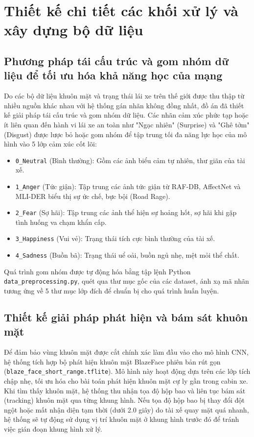 \documentclass[../DoAn.tex]{subfiles}
\begin{document}
\section{Thiết kế chi tiết các khối xử lý và xây dựng bộ dữ liệu}
\label{section:4.3}

\subsection{Phương pháp tái cấu trúc và gom nhóm dữ liệu để tối ưu hóa khả năng học của mạng}
Do các bộ dữ liệu khuôn mặt và trạng thái lái xe trên thế giới được thu thập từ nhiều nguồn khác nhau với hệ thống gán nhãn không đồng nhất, đồ án đã thiết kế giải pháp tái cấu trúc và gom nhóm dữ liệu. Các nhãn cảm xúc phức tạp hoặc ít liên quan đến hành vi lái xe an toàn như "Ngạc nhiên" (Surprise) và "Ghê tởm" (Disgust) được lược bỏ hoặc gom nhóm để tập trung tối đa năng lực học của mô hình vào 5 lớp cảm xúc cốt lõi:
\begin{itemize}
    \item \texttt{0\_Neutral} (Bình thường): Gồm các ảnh biểu cảm tự nhiên, thư giãn của tài xế.
    \item \texttt{1\_Anger} (Tức giận): Tập trung các ảnh tức giận từ RAF-DB, AffectNet và MLI-DER biểu thị sự ức chế, bực bội (Road Rage).
    \item \texttt{2\_Fear} (Sợ hãi): Tập trung các ảnh thể hiện sự hoảng hốt, sợ hãi khi gặp tình huống va chạm khẩn cấp.
    \item \texttt{3\_Happiness} (Vui vẻ): Trạng thái tích cực bình thường của tài xế.
    \item \texttt{4\_Sadness} (Buồn bã): Trạng thái uể oải, buồn ngủ nhẹ, mệt mỏi thể chất.
\end{itemize}

Quá trình gom nhóm được tự động hóa bằng tập lệnh Python \texttt{data\_preprocessing.py}, quét qua thư mục gốc của các dataset, ánh xạ mã nhãn tương ứng về 5 thư mục lớp đích để chuẩn bị cho quá trình huấn luyện.

\subsection{Thiết kế giải pháp phát hiện và bám sát khuôn mặt}
Để đảm bảo vùng khuôn mặt được cắt chính xác làm đầu vào cho mô hình CNN, hệ thống tích hợp bộ phát hiện khuôn mặt BlazeFace phiên bản rút gọn (\texttt{blaze\_face\_short\_range.tflite}).
Mô hình này hoạt động dựa trên các lớp tích chập nhẹ, tối ưu hóa cho bài toán phát hiện khuôn mặt cự ly gần trong cabin xe. Khi tìm thấy khuôn mặt, hệ thống thu nhận tọa độ hộp bao và liên tục bám sát (tracking) khuôn mặt qua từng khung hình. Nếu tọa độ hộp bao bị thay đổi đột ngột hoặc mất nhận diện tạm thời (dưới 2.0 giây) do tài xế quay mặt quá nhanh, hệ thống sẽ tự động sử dụng vị trí khuôn mặt ở khung hình trước đó để tránh việc gián đoạn khung hình xử lý.
\end{document}
